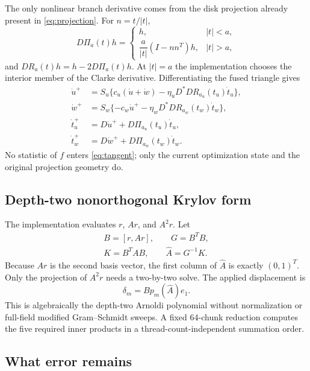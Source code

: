 \documentclass[10pt,twocolumn]{article}
\theoremstyle{definition}\newtheorem{remark}[proposition]{Remark}
\newcommand{\PiD}{\Pi}
\begin{document}
The only nonlinear branch derivative comes from the disk projection already
present in \eqref{eq:projection}.  For $n=t/|t|$,
\begin{equation}
D\PiD_a(t)h=\begin{cases}
h,&|t|<a,\\[2pt]
\dfrac{a}{|t|}(I-nn^T)h,&|t|>a,
\end{cases}
\label{eq:diskderivative}
\end{equation}
and $DR_a(t)h=h-2D\PiD_a(t)h$.  At $|t|=a$ the implementation chooses the
interior member of the Clarke derivative.  Differentiating the fused triangle
gives
\begin{align}
\dot u^+&=S_u\{c_u(\dot u+\dot w)
-\eta_uD^*DR_{a_u}(t_u)\dot t_u\},\nonumber\\
\dot w^+&=S_w\{-c_w\dot u^+
-\eta_wD^*DR_{a_w}(t_w)\dot t_w\},\label{eq:tangent}\\
\dot t_u^+&=D\dot u^++D\PiD_{a_u}(t_u)\dot t_u,\nonumber\\
\dot t_w^+&=D\dot w^++D\PiD_{a_w}(t_w)\dot t_w.\nonumber
\end{align}
No statistic of $f$ enters \eqref{eq:tangent}; only the current optimization
state and the original projection geometry do.

\subsection{Depth-two nonorthogonal Krylov form}

The implementation evaluates $r$, $Ar$, and $A^2r$.  Let
\begin{equation}
\begin{gathered}
B=[r,Ar],\qquad G=B^TB,\\
K=B^TAB,\qquad \widehat A=G^{-1}K.
\end{gathered}
\label{eq:galerkin}
\end{equation}
Because $Ar$ is the second basis vector, the first column of $\widehat A$ is
exactly $(0,1)^T$.  Only the projection of $A^2r$ needs a two-by-two solve.
The applied displacement is
\begin{equation}
\delta_m=Bp_m(\widehat A)e_1.
\label{eq:krylovjump}
\end{equation}
This is algebraically the depth-two Arnoldi polynomial without normalization
or full-field modified Gram--Schmidt sweeps.  A fixed 64-chunk reduction
computes the five required inner products in a thread-count-independent
summation order.

\subsection{What error remains}
\end{document}
